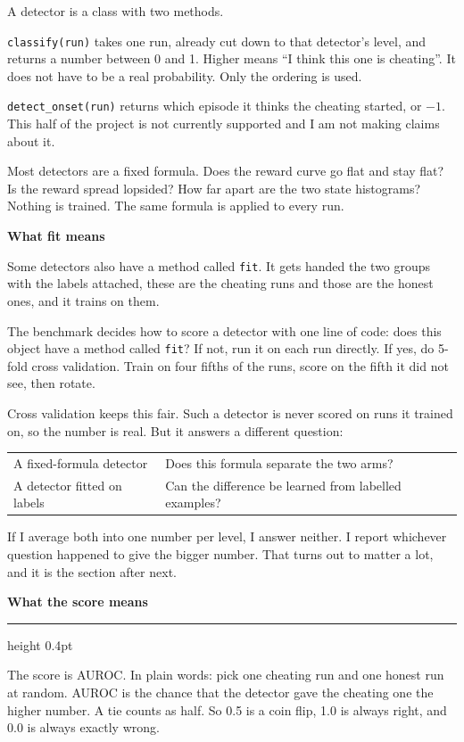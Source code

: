 \documentclass[11pt,a4paper]{article}
\newcommand{\code}[1]{\texttt{\small #1}}
\newcommand{\heading}[1]{%
  \par\vspace{1.5em}%
  \phantomsection\addcontentsline{toc}{section}{#1}%
  {\sffamily\bfseries\large #1}%
  \par\vspace{0.15em}%
  \hrule height 0.4pt%
  \par\vspace{0.5em}%
}
\newcommand{\subhead}[1]{%
  \par\vspace{0.9em}%
  {\sffamily\bfseries #1}%
  \par\vspace{0.15em}%
}
\begin{document}
A detector is a class with two methods.

\code{classify(run)} takes one run, already cut down to that detector's level, and
returns a number between 0 and 1. Higher means ``I think this one is cheating''. It
does not have to be a real probability. Only the ordering is used.

\code{detect\_onset(run)} returns which episode it thinks the cheating started, or
$-1$. This half of the project is not currently supported and I am not making
claims about it.

Most detectors are a fixed formula. Does the reward curve go flat and stay flat? Is
the reward spread lopsided? How far apart are the two state histograms? Nothing is
trained. The same formula is applied to every run.

\subhead{What fit means}
Some detectors also have a method called \code{fit}. It gets handed the two groups
with the labels attached, these are the cheating runs and those are the honest
ones, and it trains on them.

The benchmark decides how to score a detector with one line of code: does this
object have a method called \code{fit}? If not, run it on each run directly. If
yes, do 5-fold cross validation. Train on four fifths of the runs, score on the
fifth it did not see, then rotate.

Cross validation keeps this fair. Such a detector is never scored on runs it
trained on, so the number is real. But it answers a different question:

\begin{tabular}{@{}ll@{}}
\toprule
A fixed-formula detector & Does this formula separate the two arms? \\
A detector fitted on labels & Can the difference be learned from labelled examples? \\
\bottomrule
\end{tabular}

If I average both into one number per level, I answer neither. I report whichever
question happened to give the bigger number. That turns out to matter a lot, and it
is the section after next.

\heading{What the score means}
\label{h:score}

The score is AUROC. In plain words: pick one cheating run and one honest run at
random. AUROC is the chance that the detector gave the cheating one the higher
number. A tie counts as half. So 0.5 is a coin flip, 1.0 is always right, and 0.0
is always exactly wrong.
\end{document}
